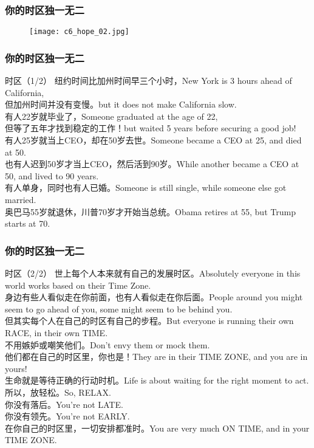 \begin{frame}
  \frametitle{你的时区独一无二}
  \begin{figure}
    \centering
    \texttt{[image: c6\_hope\_02.jpg]}
  \end{figure}
\end{frame}

\begin{frame}
  \frametitle{你的时区独一无二}
  \begin{block}{时区（1/2）}
纽约时间比加州时间早三个小时，New York is 3 hours ahead of California,\\
但加州时间并没有变慢。but it does not make California slow.\\
有人22岁就毕业了，Someone graduated at the age of 22,\\
但等了五年才找到稳定的工作！but waited 5 years before securing a good job!\\
有人25岁就当上CEO，却在50岁去世。Someone became a CEO at 25, and died at 50.\\
也有人迟到50岁才当上CEO，然后活到90岁。While another became a CEO at 50, and lived to 90 years.\\
有人单身，同时也有人已婚。Someone is still single, while someone else got married.\\
奥巴马55岁就退休，川普70岁才开始当总统。Obama retires at 55, but Trump starts at 70.\\
  \end{block}
\end{frame}

\begin{frame}
  \frametitle{你的时区独一无二}
  \begin{block}{时区（2/2）}
    {\small
世上每个人本来就有自己的发展时区。Absolutely everyone in this world works based on their Time Zone.\\
身边有些人看似走在你前面，也有人看似走在你后面。People around you might seem to go ahead of you, some might seem to be behind you.\\
但其实每个人在自己的时区有自己的步程。But everyone is running their own RACE, in their own TIME.\\
不用嫉妒或嘲笑他们。Don't envy them or mock them.\\
他们都在自己的时区里，你也是！They are in their TIME ZONE, and you are in yours!\\
生命就是等待正确的行动时机。Life is about waiting for the right moment to act.\\
所以，放轻松。So, RELAX.\\
你没有落后。You're not LATE.\\
你没有领先。You're not EARLY.\\
在你自己的时区里，一切安排都准时。You are very much ON TIME, and in your TIME ZONE.
}
  \end{block}
\end{frame}




